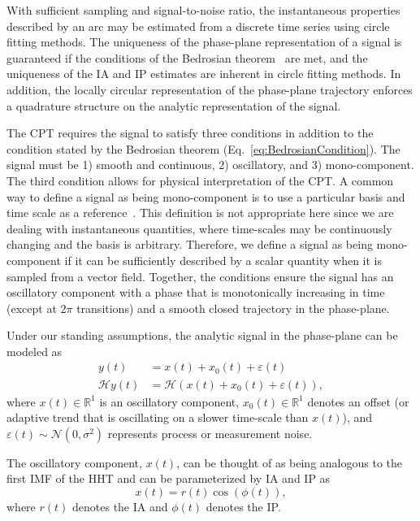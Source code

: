 \documentclass[a4paper]{IEEEtran}
\begin{document}
With sufficient sampling and signal-to-noise ratio, the instantaneous properties described by an arc may be estimated from a discrete time series using circle fitting methods. The uniqueness of the phase-plane representation of a signal is guaranteed if the conditions of the Bedrosian theorem~\cite{Bedrosian1963} are met, and the uniqueness of the IA and IP estimates are inherent in circle fitting methods. In addition, the locally circular representation of the phase-plane trajectory enforces a quadrature structure on the analytic representation of the signal.

The CPT requires the signal to satisfy three conditions in addition to the condition stated by the Bedrosian theorem (Eq.~\ref{eq:BedrosianCondition}). The signal must be 1) smooth and continuous, 2) oscillatory, and 3) mono-component. The third condition allows for physical interpretation of the CPT. A common way to define a signal as being mono-component is to use a particular basis and time scale as a reference~\cite{Boashash1992,Cohen1995}. This definition is not appropriate here since we are dealing with instantaneous quantities, where time-scales may be continuously changing and the basis is arbitrary. Therefore, we define a signal as being mono-component if it can be sufficiently described by a scalar quantity when it is sampled from a vector field. Together, the conditions ensure the signal has an oscillatory component with a phase that is monotonically increasing in time (except at $2\pi$ transitions) and a smooth closed trajectory in the phase-plane. 

Under our standing assumptions, the analytic signal in the phase-plane can be modeled as
\begin{align}\label{eq:SignalModel}
y\left( t \right) &= x\left( t \right) + x_0\left( t \right) + \varepsilon \left( t \right) \\
\mathcal{H}y\left( t \right) &= \mathcal{H}(x\left( t \right) + x_0\left( t \right) + \varepsilon \left( t \right)),
\end{align}
where $x(t) \in \mathbb{R}^1$ is an oscillatory component, $x_0(t) \in \mathbb{R}^1$ denotes an offset (or adaptive trend that is oscillating on a slower time-scale than $x(t)$), and $\varepsilon(t) \sim \mathcal{N}(0,\sigma^2)$ represents process or measurement noise. 

The oscillatory component, $x(t)$, can be thought of as being analogous to the first IMF of the HHT and can be parameterized by IA and IP as
\begin{equation}\label{eq:InstAmplitudeAndPhase}
    x\left( t \right) = r\left( t \right)\cos \left( {\phi \left( t \right)} \right),
\end{equation}
where $r(t)$ denotes the IA and $\phi(t)$ denotes the IP. 
\end{document}
